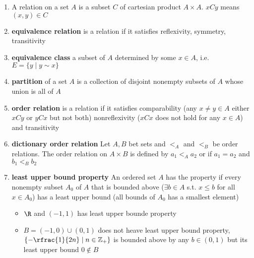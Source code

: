 \documentclass[10.5pt]{article}
\newcommand{\Z}{\mathbb{Z}}
\begin{document}
\begin{enumerate}
    \item A relation on a set $A$ is a subset $C$ of cartesian product $A\times A$. $xCy$ means $(x,y)\in C$
    \item \textbf{equivalence relation} is a relation if it satisfies reflexivity, symmetry, transitivity
    \item \textbf{equivalence class} a subset of $A$ determined by some $x\in A$, i.e. $E = \{y\mid y\sim x\}$
    \item \textbf{partition} of a set $A$ is a collection of disjoint nonempty subsets of $A$ whose union is all of $A$
    \item \textbf{order relation} is a relation if it satisfies comparability (any $x\neq y\in A$ either $xCy$ or $yCx$ but not both) nonreflexivity ($xCx$ does not hold for any $x\in A$) and transitivity
    \item \textbf{dictionary order relation} Let $A,B$ bet sets and $<_{A}$ and $<_{B}$ be order relations. The order relation on $A\times B$ is defined by $a_1 <_A a_2$ or if $a_1 = a_2$ and $b_1 <_B b_2$
    \item \textbf{least upper bound property} An ordered set $A$ has the property if every nonempty subset $A_0$ of $A$ that is bounded above ($\exists b\in A$ s.t. $x\leq b$ for all $x\in A_0$) has a least upper bound (all bounds of $A_0$ has a smallest element)
    \begin{itemize}
        \item $\R$ and $(-1,1)$ has least upper bounde property
        \item $B=(-1,0) \cup (0,1)$ does not heave least upper bound property, $\{ - \rfrac{1}{2n} \mid n\in \Z_{+} \}$ is bounded above by any $b\in (0,1)$ but its least upper bound $0 \not\in B$
    \end{itemize}
\end{enumerate}
\end{document}
